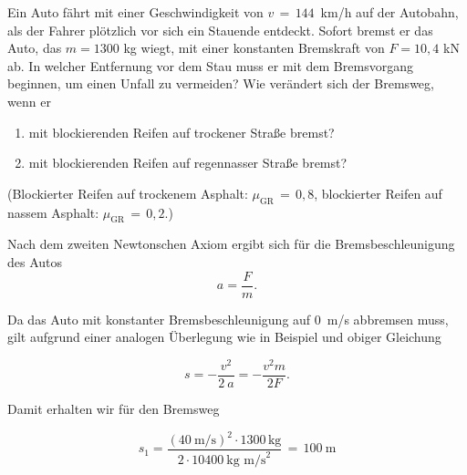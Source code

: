 \begin{MExercises}
               \begin{MExercise}
               Ein Auto f\"ahrt mit einer Geschwindigkeit von $v\,=\,144$~km/h auf der Autobahn, als der Fahrer pl\"otzlich vor sich ein Stauende entdeckt. Sofort bremst er das Auto, das $m=1300$ kg wiegt, mit einer konstanten Bremskraft von $F={10,4}$ kN ab. In welcher Entfernung vor dem Stau muss er mit dem Bremsvorgang beginnen, um einen Unfall zu vermeiden? Wie ver\"andert sich der Bremsweg, wenn er
               \begin{enumerate}
               \item mit blockierenden Reifen auf trockener Stra{\ss}e bremst?
               \item mit blockierenden Reifen auf regennasser Stra{\ss}e bremst? 
               \end{enumerate}
               (Blockierter Reifen auf trockenem Asphalt: $\mu_{\text{GR}}\,=\,{0,8}$, blockierter Reifen auf nassem Asphalt: $\mu_{\text{GR}}\,=\,{0,2}$.)
               
               
               \begin{MSolution}
               Nach dem zweiten Newtonschen Axiom ergibt sich f\"ur die Bremsbeschleunigung des Autos
               \begin{equation*}
               a=\frac{F}{m}.
               \end{equation*}
               
               Da das Auto mit konstanter Bremsbeschleunigung auf $0$~m/s abbremsen muss, gilt aufgrund einer analogen \"Uberlegung wie in Beispiel  und obiger Gleichung
               
               \begin{equation*}
               s = -\frac{v^{2}}{2~a}=-\frac{v^2m}{2F}.
               \end{equation*}
               
               Damit erhalten wir f\"ur den Bremsweg 
               
               \begin{equation*}
               s_{1} = \frac{\left(40~\text{m/s}\right)^{2}\cdot 1300\,\text{kg} }{2\cdot 10400~\text{kg~m/s}^{2}} \,=\, 100~\text{m}
               \end{equation*}
               \begin{enumerate}
               

\end{enumerate}
\end{MSolution}
\end{MExercise}
\end{MExercises}

